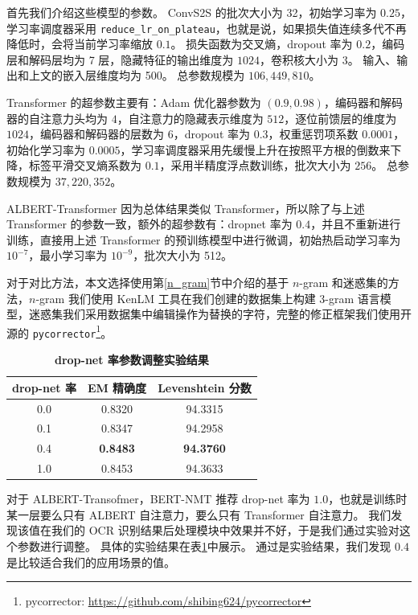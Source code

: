 首先我们介绍这些模型的参数。
ConvS2S 的批次大小为 32，初始学习率为 $0.25$，学习率调度器采用 \texttt{reduce\_lr\_on\_plateau}，也就是说，如果损失值连续多代不再降低时，会将当前学习率缩放 $0.1$。
损失函数为交叉熵，dropout 率为 $0.2$，编码层和解码层均为 7 层，隐藏特征的输出维度为 $1024$，卷积核大小为 3。
输入、输出和上文的嵌入层维度均为 500。
总参数规模为 $106,449,810$。

Transformer 的超参数主要有：Adam 优化器参数为 $(0.9, 0.98)$，编码器和解码器的自注意力头均为 $4$，自注意力的隐藏表示维度为 $512$，逐位前馈层的维度为 $1024$，编码器和解码器的层数为 6，dropout 率为 $0.3$，权重惩罚项系数 $0.0001$，初始化学习率为 $0.0005$，学习率调度器采用先缓慢上升在按照平方根的倒数来下降，标签平滑交叉熵系数为 $0.1$，采用半精度浮点数训练，批次大小为 $256$。
总参数规模为 $37,220,352$。

ALBERT-Transformer 因为总体结果类似 Transformer，所以除了与上述 Transformer 的参数一致，额外的超参数有：dropnet 率为 $0.4$，并且不重新进行训练，直接用上述 Transformer 的预训练模型中进行微调，初始热启动学习率为 $10^{-7}$，最小学习率为 $10^{-9}$，批次大小为 512。

对于对比方法，本文选择使用第\ref{n_gram}节中介绍的基于 $n$-gram 和迷惑集的方法，$n$-gram 我们使用 KenLM 工具在我们创建的数据集上构建 $3$-gram 语言模型，迷惑集我们采用数据集中编辑操作为替换的字符，完整的修正框架我们使用开源的 \texttt{pycorrector}\footnote{pycorrector: \url{https://github.com/shibing624/pycorrector}}。

\begin{table}[!hpt]
	\caption[]{\textbf{drop-net 率参数调整实验结果}}
	\label{tab:result_dropnet}
	\centering
	\begin{tabular}{c c c}
		\hline
		\textbf{drop-net 率} & \textbf{EM 精确度} & \textbf{Levenshtein 分数} \\
		\hline
		0.0 & 0.8320 & 94.3315 \\
		0.1 & 0.8347 & 94.2958 \\
		0.4 & \textbf{0.8483} & \textbf{94.3760} \\
		1.0 & 0.8453 & 94.3633 \\
		\hline
	\end{tabular}
\end{table}

对于 ALBERT-Transofmer，BERT-NMT\cite{bert_nmt} 推荐 drop-net 率为 $1.0$，也就是训练时某一层要么只有 ALBERT 自注意力，要么只有 Transformer 自注意力。
我们发现该值在我们的 OCR 识别结果后处理模块中效果并不好，于是我们通过实验对这个参数进行调整。
具体的实验结果在表\ref{tab:result_dropnet}中展示。
通过是实验结果，我们发现 $0.4$ 是比较适合我们的应用场景的值。

